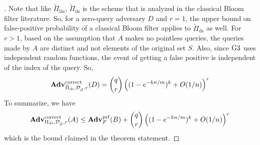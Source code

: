 \begin{proof}[]
Note that like $\tilde{\Pi}_{\mathrm{lin}}$, $\tilde{\Pi}_{\mathrm{ds}}$ is the scheme that is analyzed in the classical Bloom filter literature. So, for a zero-query adversary $D$ and $r=1$, the upper bound on false-positive probability of a classical Bloom filter applies to $\tilde{\Pi}_{\mathrm{ds}}$ as well. For $r > 1$, based on the assumption that $A$ makes no pointless queries, the queries made by $A$ are distinct and not elements of the original set $S$. Also, since $\text{G3}$ uses independent random functions, the event of getting a false positive is independent of the index of the query. So,
\begin{equation*}
\mathrm{\mathbf{Adv}}^{\mathrm{correct}}_{\tilde{\Pi}_{\mathrm{ds}},\mathcal{D}_{{\cal S}}^{},r}(D) =   {\dbinom{q}{r}} \left( (1-e^{-kn/m})^k + O(1/n) \right)^r
\end{equation*}
\noindent
To summarize, we have
\[
\mathrm{\mathbf{Adv}}^{\mathrm{correct}}_{\Pi_{\mathrm{ds}},\mathcal{D}_{{\cal S}}^{},r}(A) \leq  \mathbf{Adv}^{\mathrm{prf}}_{F}(B)  + {\dbinom{q}{r}} \left( (1-e^{-kn/m})^k + O(1/n) \right)^r
\]
which is the bound claimed in the theorem statement. %


\end{proof}
